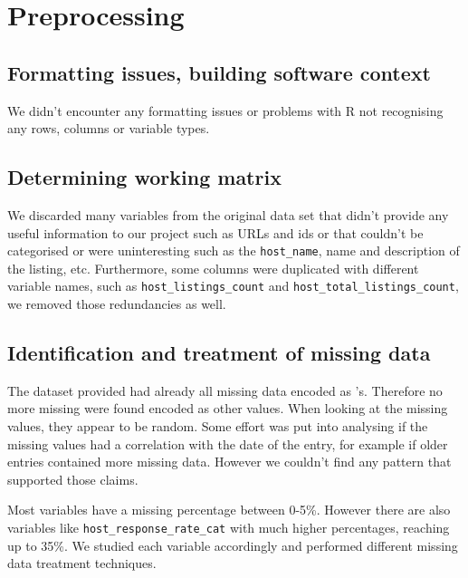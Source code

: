 

\section{Preprocessing}%
\label{sec:preprocessing}


\subsection{Formatting issues, building software context}

We didn't encounter any formatting issues or problems with R not recognising
any rows, columns or variable types.

\subsection{Determining working matrix}%
\label{ssub:work_matrix}

We discarded many variables from the original data set that didn't provide any
useful information to our project such as URLs and ids or that couldn't be
categorised or were uninteresting such as the \texttt{host\_name}, name and
description of the listing, etc. Furthermore, some columns were duplicated with
different variable names, such as \texttt{host\_listings\_count} and
\texttt{host\_total\_listings\_count}, we removed those redundancies as well.

\subsection{Identification and treatment of missing data}

The dataset provided had already all missing data encoded as \NA's. Therefore no
more missing were found encoded as other values. When looking at the missing
values, they appear to be random. Some effort was put into analysing if the missing values had a correlation with the date of the entry, for example if older entries contained more missing data. However we couldn't find any pattern that supported those claims.

Most variables have a missing percentage between 0-5\%. However there are also
variables like \texttt{host\_response\_rate\_cat} with much higher percentages,
reaching up to 35\%. We studied each variable accordingly and performed different missing data treatment techniques.

